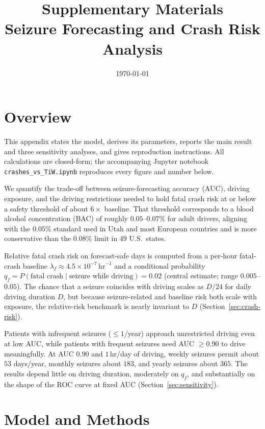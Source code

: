 \documentclass[11pt]{article}
\title{\bfseries Supplementary Materials\\
\large Seizure Forecasting and Crash Risk Analysis}
\author{}
\date{\today}
\numberwithin{equation}{section}
\begin{document}
\maketitle
\tableofcontents
\bigskip

\section{Overview}
\label{sec:overview}

This appendix states the model, derives its parameters, reports the main result and
three sensitivity analyses, and gives reproduction instructions. All calculations are
closed-form; the accompanying Jupyter notebook \texttt{crashes\_vs\_TiW.ipynb}
reproduces every figure and number below.

We quantify the trade-off between seizure-forecasting accuracy (AUC), driving exposure,
and the driving restrictions needed to hold fatal crash risk at or below a safety
threshold of about $6\times$ baseline. That threshold corresponds to a blood alcohol
concentration (BAC) of roughly $0.05$--$0.07\%$ for adult drivers, aligning with the
$0.05\%$ standard used in Utah and most European countries and is more conservative
than the $0.08\%$ limit in $49$ U.S.\ states.

Relative fatal crash risk on forecast-safe days is computed from a per-hour fatal-crash
baseline $\lambda_f \approx 4.5 \times 10^{-7}\,\text{hr}^{-1}$ and a conditional
probability $q_f = P(\text{fatal crash} \mid \text{seizure while driving}) = 0.02$
(central estimate; range $0.005$--$0.05$). The chance that a seizure coincides with
driving scales as $D/24$ for daily driving duration $D$, but because seizure-related
and baseline risk both scale with exposure, the relative-risk benchmark is nearly
invariant to $D$ (Section~\ref{sec:crash-risk}).

Patients with infrequent seizures ($\le 1$/year) approach unrestricted driving even at
low AUC, while patients with frequent seizures need AUC $\ge 0.90$ to drive
meaningfully. At AUC $0.90$ and $1$\,hr/day of driving, weekly seizures permit about
$53$ days/year, monthly seizures about $183$, and yearly seizures about $365$. The
results depend little on driving duration, moderately on $q_f$, and substantially on
the shape of the ROC curve at fixed AUC (Section~\ref{sec:sensitivity}).

\section{Model and Methods}
\label{sec:methods}
\end{document}
